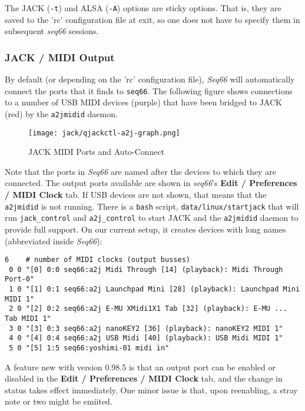    The JACK (\texttt{-t}) and ALSA (\texttt{-A}) options are sticky options.
   That is, they are saved to the 'rc' configuration file at exit,
   so one does not have to specify them in subsequent \textsl{seq66} sessions.

\subsubsection{JACK / MIDI Output}
\label{subsubsec:jack_midi_output}

   By default (or depending on the 'rc' configuration file),
   \textsl{Seq66} will
   automatically connect the ports that it finds to \texttt{seq66}.
   The following figure shows connections to a number of USB MIDI devices
   (purple) that have been bridged to JACK (red) by the \texttt{a2jmidid}
   daemon.

\begin{figure}[H]
   \centering 
   \texttt{[image: jack/qjackctl-a2j-graph.png]}
   \caption{JACK MIDI Ports and Auto-Connect}
   \label{fig:jack_midi_ports_auto_connect}
\end{figure}

   Note that the ports in \textsl{Seq66} are named after the devices to which
   they are connected.
	The output ports available are shown in \textsl{seq66}'s
	\textbf{Edit / Preferences / MIDI Clock} tab.
   If USB devices are not shown, that means
   that the \texttt{a2jmidid} is not running.
   There is a \texttt{bash} script, \texttt{data/linux/startjack}
   that will run \texttt{jack\_control} and \texttt{a2j\_control} to start JACK
   and the \texttt{a2jmidid} daemon to provide full support.
   On our current setup, it creates devices with long names (abbreviated inside
   \textsl{Seq66}):

   \begin{verbatim}
6    # number of MIDI clocks (output busses)
 0 0 "[0] 0:0 seq66:a2j Midi Through [14] (playback): Midi Through Port-0"
 1 0 "[1] 0:1 seq66:a2j Launchpad Mini [28] (playback): Launchpad Mini MIDI 1"
 2 0 "[2] 0:2 seq66:a2j E-MU XMidi1X1 Tab [32] (playback): E-MU ... Tab MIDI 1"
 3 0 "[3] 0:3 seq66:a2j nanoKEY2 [36] (playback): nanoKEY2 MIDI 1"
 4 0 "[4] 0:4 seq66:a2j USB Midi [40] (playback): USB Midi MIDI 1"
 5 0 "[5] 1:5 seq66:yoshimi-01 midi in"
   \end{verbatim}

   A feature new with version 0.98.5 is that an output port can be enabled or
   disabled in the 
	\textbf{Edit / Preferences / MIDI Clock} tab,
   and the change in status takes effect immediately.
   One minor issue is that, upon reenabling, a stray note or two might be
   emiited.

